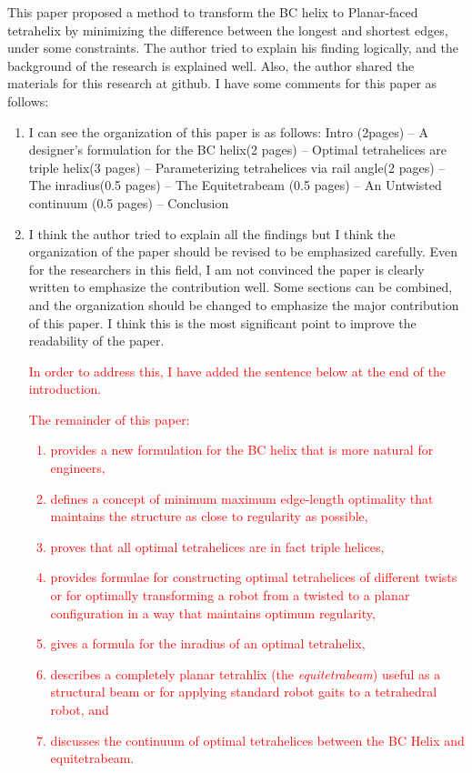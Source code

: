 \documentclass{article}
\newcommand{\highlighttext}[1] {\textcolor{red}{#1}}
\begin{document}
This paper proposed a method to transform the BC helix to Planar-faced tetrahelix by minimizing the difference between the longest and shortest edges, under some constraints. The author tried to explain his finding logically, and the background of the research is explained well. Also, the author shared the materials for this research at github. I have some comments for this paper as follows:

\begin{enumerate}

  \item
 I can see the organization of this paper is as follows: 
 Intro (2pages) – A designer’s formulation for the BC helix(2 pages) – Optimal tetrahelices are triple helix(3 pages) – Parameterizing tetrahelices via rail angle(2 pages) – The inradius(0.5 pages) – The Equitetrabeam (0.5 pages) – An Untwisted continuum (0.5 pages) – Conclusion
 \item 
   I think the author tried to explain all the findings but I think the organization of the paper should be revised to be emphasized carefully. Even for the researchers in this field, I am not convinced the paper is clearly written to emphasize the contribution well. Some sections can be combined, and the organization should be changed to emphasize the major contribution of this paper. I think this is the most significant point to improve the readability of the paper.

   \highlighttext{
     In order to address this, I have added the sentence below at the end of the introduction.
     }

   \highlighttext {
The remainder of this  paper:
\begin{enumerate}
\item provides a new formulation for the BC helix that is more natural for engineers,
\item defines a concept of minimum maximum edge-length optimality that maintains
  the structure as close to regularity as possible,
  \item proves that all
    optimal tetrahelices are in fact triple helices,
\item provides formulae for constructing optimal tetrahelices of different twists or for optimally
    transforming a
    robot from a twisted to a planar configuration in a way that maintains optimum regularity,
\item gives a formula for the inradius of an optimal tetrahelix,
\item describes a completely planar tetrahlix (the \emph{equitetrabeam}) useful as
  a structural beam or for applying standard robot gaits to a tetrahedral robot, and
\item discusses the continuum of optimal tetrahelices between the BC Helix and equitetrabeam.
  \end{enumerate}
}


\end{enumerate}
\end{document}
